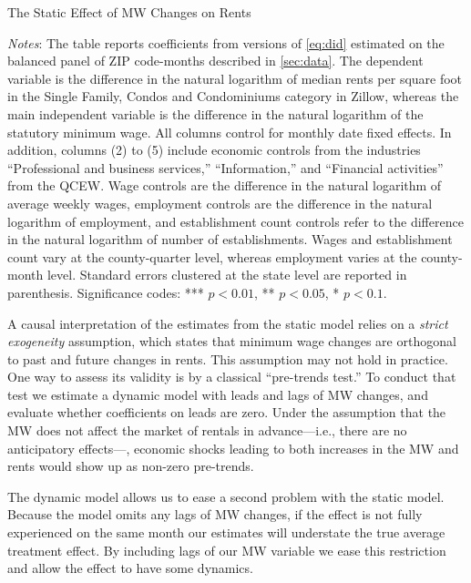 \begin{table}[h!]
    \caption{The Static Effect of MW Changes on Rents}
    \label{tab:static_model}
    \centering
    
    \begin{minipage}{0.95\textwidth} \footnotesize
		\vspace{3mm} 
		\textit{Notes}: The table reports coefficients from versions of \autoref{eq:did} 
		estimated on the balanced panel of ZIP code-months described in \autoref{sec:data}. 
		The dependent variable is the difference in the natural logarithm of median	rents 
		per square foot in the Single Family, Condos and Condominiums category in Zillow, 
		whereas the main independent variable is the difference in the natural logarithm of 
		the statutory minimum wage. All columns control for monthly date fixed effects. In 
		addition, columns (2) to (5) include economic controls from the industries 
		``Professional and business services,'' ``Information,'' and ``Financial activities'' 
		from the QCEW. Wage controls are the difference in the natural logarithm of average 
		weekly wages, employment controls are the difference in the natural logarithm of 
		employment, and establishment count controls refer to the difference in the natural 
		logarithm of number of establishments. Wages and establishment count vary at the 
		county-quarter level, whereas employment varies at the county-month level. 
		Standard errors clustered at the state level are reported in parenthesis. Significance 
		codes: *** $p < 0.01$, ** $p < 0.05$, * $p < 0.1$.
	\end{minipage}
\end{table}

A causal interpretation of the estimates from the static model relies on a \textit{strict 
exogeneity} assumption, which states that minimum wage changes are orthogonal to past and 
future changes in rents. This assumption may not hold in practice. One way to assess its 
validity is by a classical ``pre-trends test.'' To conduct that test we estimate a dynamic 
model with leads and lags of MW changes, and evaluate whether coefficients on leads are zero. 
Under the assumption that the MW does not affect the market of rentals in advance---i.e., there
are no anticipatory effects---, economic shocks leading to both increases in the MW and rents 
would show up as non-zero pre-trends. 

The dynamic model allows us to ease a second problem with the static model. Because the model
omits any lags of MW changes, if the effect is not fully experienced on the same month our 
estimates will understate the true average treatment effect. By including lags of our MW variable
we ease this restriction and allow the effect to have some dynamics.

